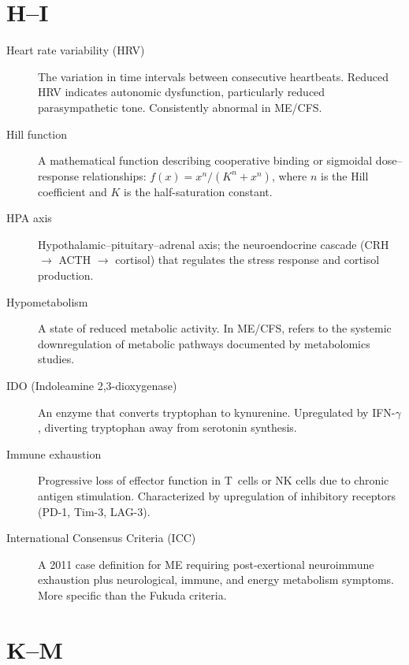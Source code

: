 \section*{H--I}

\begin{description}
\item[Heart rate variability (HRV)] The variation in time intervals between consecutive heartbeats. Reduced HRV indicates autonomic dysfunction, particularly reduced parasympathetic tone. Consistently abnormal in ME/CFS.
\item[Hill function] A mathematical function describing cooperative binding or sigmoidal dose--response relationships: $f(x) = x^n / (K^n + x^n)$, where $n$ is the Hill coefficient and $K$ is the half-saturation constant.
\item[HPA axis] Hypothalamic--pituitary--adrenal axis; the neuroendocrine cascade (CRH $\to$ ACTH $\to$ cortisol) that regulates the stress response and cortisol production.
\item[Hypometabolism] A state of reduced metabolic activity. In ME/CFS, refers to the systemic downregulation of metabolic pathways documented by metabolomics studies.
\item[IDO (Indoleamine 2,3-dioxygenase)] An enzyme that converts tryptophan to kynurenine. Upregulated by IFN-$\gamma$, diverting tryptophan away from serotonin synthesis.
\item[Immune exhaustion] Progressive loss of effector function in T~cells or NK cells due to chronic antigen stimulation. Characterized by upregulation of inhibitory receptors (PD-1, Tim-3, LAG-3).
\item[International Consensus Criteria (ICC)] A 2011 case definition for ME requiring post-exertional neuroimmune exhaustion plus neurological, immune, and energy metabolism symptoms. More specific than the Fukuda criteria.
\end{description}

\section*{K--M}

